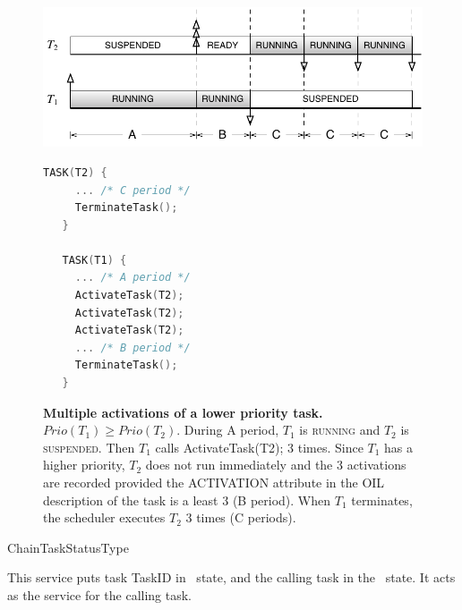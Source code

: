 \begin{figure}[htbp] %
   \centering
   \begin{minipage}[c]{.6\linewidth}
   \includegraphics[scale=.7]{pictures/schedulingMultiple.pdf}
   \end{minipage}\hfill
   \begin{minipage}[c]{.3\linewidth}
   \begin{lstlisting}[language=C]
   TASK(T2) {
     ... /* C period */
     TerminateTask();
   }
   
   TASK(T1) {
     ... /* A period */
     ActivateTask(T2);
     ActivateTask(T2);
     ActivateTask(T2);
     ... /* B period */
     TerminateTask();
   }
 \end{lstlisting}
   \end{minipage}
   \caption{{\bfseries Multiple activations of a lower priority task.} $Prio(T_1) \ge Prio(T_2)$. During A period, $T_1$ is {\sffamily\scshape running} and $T_2$ is {\sffamily\scshape suspended}. Then $T_1$ calls {\upshape\ttfamily ActivateTask(T2);} 3 times. Since $T_1$ has a higher priority, $T_2$ does not run immediately and the 3 activations are recorded provided the ACTIVATION attribute in the OIL description of the task is a least 3 (B period). When $T_1$ terminates, the scheduler executes $T_2$ 3 times (C periods).}
   \label{fig:scheduleMultiple}
\end{figure} 



\begin{service}{ChainTask}{StatusType}


This service puts task TaskID in \READY\ state, and the calling task in the \SUSPENDED\ state. It acts as the  service for the calling task.
\end{service}

